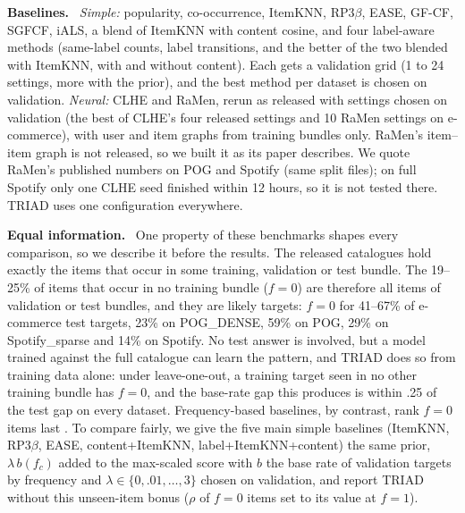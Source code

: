 \documentclass[runningheads]{llncs}
\renewcommand{\paragraph}[1]{\smallskip\noindent\textbf{#1}\ }
\begin{document}
\paragraph{Baselines.} \emph{Simple:} popularity, co-occurrence, ItemKNN, RP3$\beta$, EASE, GF-CF, SGFCF, iALS, a
blend of ItemKNN with content cosine, and four label-aware methods (same-label counts, label transitions, and the
better of the two blended with ItemKNN, with and without content). Each gets a validation grid (1 to 24 settings, more with the prior), and
the best method per dataset is chosen on validation. \emph{Neural:} CLHE and RaMen, rerun as released with settings
chosen on validation (the best of CLHE's four released settings and 10 RaMen settings on e-commerce), with user and
item graphs from training bundles only. RaMen's item--item graph is not released, so we built it as its paper
describes. We quote RaMen's published numbers on POG and Spotify (same split files); on full Spotify only one CLHE seed
finished within 12 hours, so it is not tested there. TRIAD uses one configuration everywhere.

\paragraph{Equal information.} One property of these benchmarks shapes every comparison, so we describe it before the
results. The released catalogues hold exactly the items that occur in some training, validation or test bundle. The
19--25\% of items that occur in no training bundle ($f=0$) are therefore all items of validation or test bundles, and
they are likely targets: $f=0$ for 41--67\% of e-commerce test targets, 23\% on POG\_DENSE, 59\% on POG, 29\% on
Spotify\_sparse and 14\% on Spotify. No test answer is involved, but a model trained against the full catalogue can
learn the pattern, and TRIAD does so from training data alone: under leave-one-out, a training target seen in no other
training bundle has $f=0$, and the base-rate gap this produces is within .25 of the test gap on every dataset. Frequency-based baselines, by contrast, rank
$f=0$ items last \cite{abdollahpouri2017}. To compare fairly, we give the five main simple baselines (ItemKNN,
RP3$\beta$, EASE, content+ItemKNN, label+ItemKNN+content) the same prior, $\lambda\,b(f_c)$ added to the max-scaled
score with $b$ the base rate of validation targets by frequency and $\lambda\in\{0,.01,\dots,3\}$ chosen on
validation, and report TRIAD without this
unseen-item bonus ($\rho$ of $f=0$ items set to its value at $f=1$).
\end{document}
